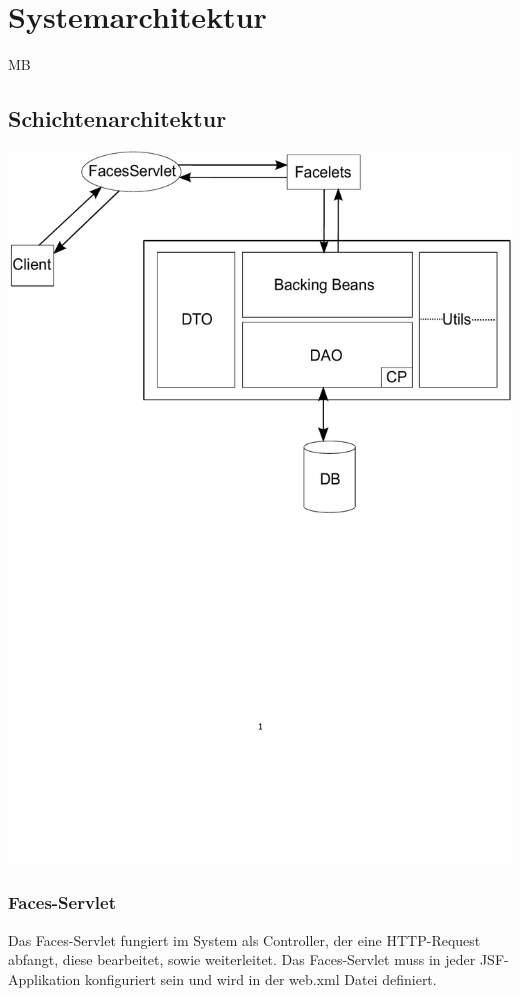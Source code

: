 \chapter{Systemarchitektur}
\begin{tiny}
MB
\end{tiny}
\section{Schichtenarchitektur}
    \includegraphics[scale=0.45]{Grafiken/Schichtenarchitektur.pdf}
	\subsection{Faces-Servlet}
	    Das Faces-Servlet fungiert im System als Controller, der eine HTTP-Request abfangt, diese bearbeitet, sowie weiterleitet. Das Faces-Servlet muss in jeder JSF-Applikation konfiguriert sein und wird in der web.xml Datei definiert. 
